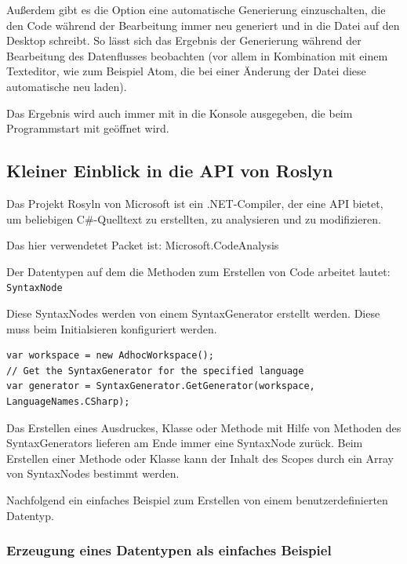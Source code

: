 Außerdem gibt es die Option eine automatische Generierung einzuschalten, die
den Code während der Bearbeitung immer neu generiert und in die Datei
auf den Desktop schreibt. So lässt sich das Ergebnis der Generierung während der Bearbeitung
des Datenflusses beobachten (vor allem in Kombination mit einem
Texteditor, wie zum Beispiel Atom, die bei einer Änderung der Datei diese automatische neu laden).

Das Ergebnis wird auch immer mit in die Konsole ausgegeben, die beim
Programmstart mit geöffnet wird.


\subsection{Kleiner Einblick in die API von Roslyn}

Das Projekt Rosyln von Microsoft ist ein .NET-Compiler, der eine API bietet, um beliebigen C\#-Quelltext zu erstellten,
zu analysieren und zu modifizieren.

Das hier verwendetet Packet ist: Microsoft.CodeAnalysis

Der Datentypen auf dem die Methoden zum Erstellen von Code arbeitet lautet:
\texttt{SyntaxNode} 

Diese SyntaxNodes werden von einem SyntaxGenerator erstellt werden.
Diese muss beim Initialsieren konfiguriert werden.

\begin{lstlisting}[caption=SyntaxGenerator für C\# erhalten]
var workspace = new AdhocWorkspace();
// Get the SyntaxGenerator for the specified language
var generator = SyntaxGenerator.GetGenerator(workspace, LanguageNames.CSharp);
\end{lstlisting}


Das Erstellen eines Ausdruckes, Klasse oder Methode mit Hilfe von Methoden
des SyntaxGenerators lieferen am Ende immer eine SyntaxNode zurück.
Beim Erstellen einer Methode oder Klasse kann der Inhalt des Scopes durch
ein Array von SyntaxNodes bestimmt werden.

Nachfolgend ein einfaches Beispiel zum Erstellen von einem
benutzerdefinierten Datentyp.


	\subsubsection{Erzeugung eines Datentypen als einfaches Beispiel}

